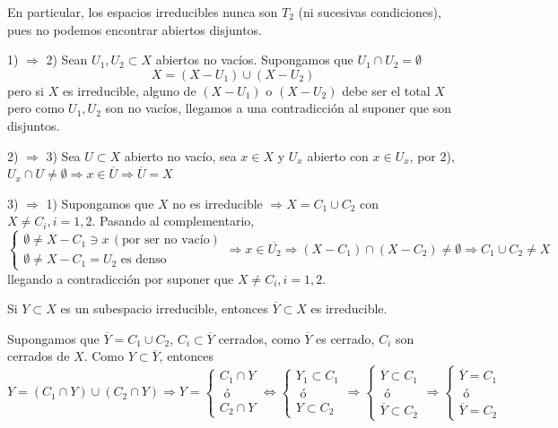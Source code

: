 \begin{cor}
    En particular, los espacios irreducibles nunca son $T_2$ (ni sucesivas condiciones), pues no podemos encontrar abiertos disjuntos.
\end{cor}
\begin{dem}
    1) $\Rightarrow$ 2) Sean $U_1, U_2 \subset X$ abiertos no vac\'ios. Supongamos que $U_1 \cap U_2 = \emptyset$
    $$X = (X-U_1)\cup (X-U_2) $$
    pero si $X$ es irreducible, alguno de $(X-U_1)$ o $(X-U_2)$ debe ser el total $X$ pero como $U_1,U_2$ son no vac\'ios, llegamos a una contradicci\'on al suponer que son disjuntos.

    2) $\Rightarrow$ 3) Sea $U\subset X$ abierto no vac\'io, sea $x\in X$ y $U_x$ abierto con $x\in U_x$, por 2), $U_x \cap U \neq \emptyset \Rightarrow x\in \overline{U} \Rightarrow \overline{U} = X$  

    3) $\Rightarrow$ 1) Supongamos que $X$ no es irreducible $\Rightarrow X = C_1 \cup C_2$ con $X \neq C_i, i =1,2$. Pasando al complementario, 
    $$\begin{cases}
        \emptyset \neq X- C_1 \ni x \, (\text{por ser no vac\'io})\\ \emptyset \neq X- C_1 =U_2 \text{ es denso}
    \end{cases} \Rightarrow x\in \overline{U_2} \Rightarrow (X-C_1) \cap (X-C_2) \neq \emptyset \Rightarrow C_1 \cup C_2 \neq X $$
    llegando a contradicci\'on por suponer que $X \neq C_i, i=1,2$.
\end{dem}
\begin{propi}
    Si $Y \subset X$ es un subespacio irreducible, entonces $\overline{Y} \subset X$ es irreducible.
\end{propi} 
    \begin{dem}
    Supongamos que $\overline{Y} = C_1\cup C_2$, $C_i \subset \overline{Y}$ cerrados, como $\overline{Y}$ es cerrado, $C_i$ son cerrados de $X$. Como $Y \subset \overline{Y}$, entonces
    $$Y = (C_1\cap Y) \cup (C_2 \cap Y) \Rightarrow Y = \begin{cases}
        C_1\cap Y \\[-3mm] \text{ \'o } \\[-3mm] C_2\cap Y 
    \end{cases} \iff \begin{cases} Y_1 \subset C_1 \\[-3mm] \text{ \'o } \\[-3mm] Y \subset C_2 \end{cases}\Rightarrow \begin{cases}  \overline{Y} \subset C_1\\[-3mm] \text{ \'o } \\[-3mm]  \overline{Y} \subset C_2 \end{cases} \Rightarrow  \begin{cases} \overline{Y} = C_1 \\[-3mm] \text{ \'o } \\[-3mm]  \overline{Y} =C_2\end{cases}$$
    \end{dem}
